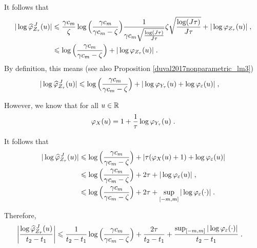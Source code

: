 It follows that 
		\begin{subequations}
		\begin{align*}
			| \log \widehat \varphi_{Z_\tau}^{\, J}(u) |
			&\leqslant
	        \frac{\gamma c_m}{\zeta}
	        \log \Big( \frac{\gamma c_m}{\gamma c_m- \zeta}\Big)
	        \frac{1}{\gamma c_m \sqrt{\frac{\log(J\tau)}{J \tau}}} 
	        \zeta \sqrt{\frac{\log(J\tau)}{J \tau}}
	        + 
	        |\log \varphi_{Z_\tau}(u) |
	        \; ,
	        \\
	        &\leqslant
	        \log \Big( \frac{\gamma c_m}{\gamma c_m- \zeta}\Big)
	        + 
	        |\log \varphi_{Z_\tau}(u) |
	        \; .
		\end{align*}
	\end{subequations}
By definition, this means (see also Proposition \ref{duval2017nonparametric_lm3})
		\begin{subequations}
		\begin{align*}
			| \log \widehat \varphi_{Z_\tau}^{\, J}(u) |
	        &\leqslant
	        	        \log \Big( \frac{\gamma c_m}{\gamma c_m- \zeta}\Big)
	        + 
	        |\log \varphi_{Y_\tau}(u) + \log \varphi_{\varepsilon}(u)  |
	        \; ,
		\end{align*}
	\end{subequations}

However, we know that for all $u \in \mathbb{R}$
	\begin{equation*}
		\varphi_X(u) = 1 + \frac{1}{\tau} \log \varphi_{Y_\tau} (u)
		\; .
	\end{equation*}
	
It follows that 
	\begin{subequations}
		\begin{align*}
			| \log \widehat \varphi_{Z_\tau}^{\, J}(u) |
	        &\leqslant
	        \log \Big( \frac{\gamma c_m}{\gamma c_m- \zeta}\Big)
	        + 
	        | \tau (\varphi_X(u) + 1) + \log \varphi_{\varepsilon}(u)  |
	        \\
	        & \leqslant
			\log \Big( \frac{\gamma c_m}{\gamma c_m- \zeta}\Big)
	        + 
	        2 \tau + | \log \varphi_{\varepsilon}(u)  |
	        \; ,
	        \\
	        & \leqslant
			\log \Big( \frac{\gamma c_m}{\gamma c_m- \zeta}\Big)
	        + 
	        2 \tau + \sup_{[-m, m]}{| \log \varphi_{\varepsilon}(\cdot)|}
	        \; .
		\end{align*}
	\end{subequations}


Therefore,
		\begin{align*}
			\bigg| \frac{\log \widehat \varphi_{Z_\tau}^{\, J}(u)}{t_2 - t_1} \bigg|
	        &\leqslant \frac{1}{t_2 - t_1}
			\log \Big( \frac{\gamma c_m}{\gamma c_m- \zeta}\Big)
	        + 
	        \frac{2 \tau}{t_2 - t_1} + \frac{\sup_{[-m, m]}{| \log \varphi_{\varepsilon}(\cdot)|}}{t_2 - t_1}
         \; .
		\end{align*}


